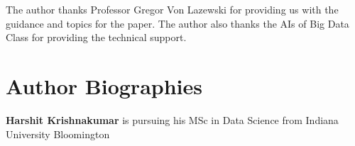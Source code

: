 \documentclass[9pt,twocolumn,twoside]{../../styles/osajnl}
\begin{document}
The author thanks Professor Gregor Von Lazewski for providing us with the guidance and topics for the paper. The author also thanks the AIs of Big Data Class for providing the technical support.




 
\section*{Author Biographies}
\begingroup
\setlength\intextsep{0pt}
\begin{minipage}[t][3.2cm][t]{1.0\columnwidth} %
{\bfseries Harshit Krishnakumar} is pursuing his MSc in Data Science from
Indiana University Bloomington
\end{minipage}
\endgroup
\end{document}
